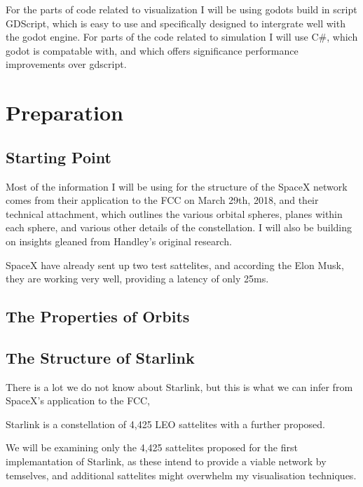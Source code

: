 \documentclass[12pt]{article}
\begin{document}
For the parts of code related to visualization I will be using godots build in script GDScript, which is easy to use and specifically designed to intergrate well with the godot engine. For parts of the code related to simulation I will use C\#, which godot is compatable with, and which offers significance performance improvements over gdscript.

\section{Preparation}




\subsection{Starting Point}

Most of the information I will be using for the structure of the SpaceX network comes from their application to the FCC on March 29th, 2018\cite{FCCApplication}, and their technical attachment\cite{TechnicalAttachment}, which outlines the various orbital spheres, planes within each sphere, and various other details of the constellation. I will also be building on insights gleaned from Handley's original research.


SpaceX have already sent up two test sattelites, and according the Elon Musk, they are working very well, providing a latency of only 25ms\cite{ElonMuskTweet}.


\subsection{The Properties of Orbits}


\subsection{The Structure of Starlink}

There is a lot we do not know about Starlink, but this is what we can infer from SpaceX’s application to the FCC\cite{FCCApplication}, 

Starlink is a constellation of 4,425 LEO sattelites with a further proposed. %

We will be examining only the 4,425 sattelites proposed for the first implemantation of Starlink, as these intend to provide a viable network by temselves, and additional sattelites might overwhelm my visualisation techniques. 
\end{document}
